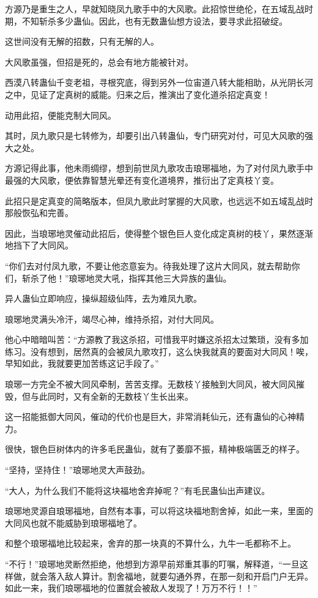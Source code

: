 \begin{this_body}
方源乃是重生之人，早就知晓凤九歌手中的大风歌。此招惊世绝伦，在五域乱战时期，不知斩杀多少蛊仙。因此，也有无数蛊仙想方设法，要寻求此招破绽。

这世间没有无解的招数，只有无解的人。

大风歌虽强，但招是死的，总会有地方能被针对。

西漠八转蛊仙千变老祖，寻根究底，得到另外一位宙道八转大能相助，从光阴长河之中，见证了定真树的威能。归来之后，推演出了变化道杀招定真变！

动用此招，便能克制大同风。

其时，凤九歌只是七转修为，却要引出八转蛊仙，专门研究对付，可见大风歌的强大之处。

方源记得此事，他未雨绸缪，想到前世凤九歌攻击琅琊福地，为了对付凤九歌手中最强的大风歌，便依靠智慧光晕还有变化道境界，推衍出了定真枝丫变。

此招只是定真变的简略版本，但凤九歌此时掌握的大风歌，也远远不如五域乱战时那般恢弘和完善。

因此，当琅琊地灵催动此招后，使得整个银色巨人变化成定真树的枝丫，果然逐渐地挡下了大同风。

“你们去对付凤九歌，不要让他恣意妄为。待我处理了这片大同风，就去帮助你们，斩杀了他！”琅琊地灵大吼，指挥其他三大异族的蛊仙。

异人蛊仙立即响应，操纵超级仙阵，去为难凤九歌。

琅琊地灵满头冷汗，竭尽心神，维持杀招，对付大同风。

他心中暗暗叫苦：“方源教了我这杀招，可惜我平时嫌这杀招太过繁琐，没有多加练习。没有想到，居然真的会被凤九歌攻打，这么快我就真的要面对大同风！唉，早知如此，我就要更加苦练这记手段了。”

琅琊一方完全不被大同风牵制，苦苦支撑。无数枝丫接触到大同风，被大同风摧毁，但与此同时，又有全新的无数枝丫生长出来。

这一招能抵御大同风，催动的代价也是巨大，非常消耗仙元，还有蛊仙的心神精力。

很快，银色巨树体内的许多毛民蛊仙，就有了萎靡不振，精神极端匮乏的样子。

“坚持，坚持住！”琅琊地灵大声鼓劲。

“大人，为什么我们不能将这块福地舍弃掉呢？”有毛民蛊仙出声建议。

琅琊地灵源自琅琊福地，自然有本事，可以将这块福地割舍掉，如此一来，里面的大同风也就不能威胁到琅琊福地了。

和整个琅琊福地比较起来，舍弃的那一块真的不算什么，九牛一毛都称不上。

“不行！”琅琊地灵断然拒绝，他想到方源早前郑重其事的叮嘱，解释道，“一旦这样做，就会落入敌人算计。割舍福地，就要勾通外界，在那一刻和开启门户无异。如此一来，我们琅琊福地的位置就会被敌人发现了！万万不行！！”


\end{this_body}

